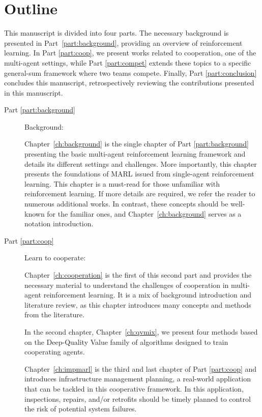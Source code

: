 \section{Outline}
\label{sec:ch1_outline}
This manuscript is divided into four parts.
The necessary background is presented in Part~\ref{part:background}, providing an overview of reinforcement learning.
In Part \ref{part:coop}, we present works related to cooperation, one of the multi-agent settings, while Part \ref{part:compet} extends these topics to a specific general-sum framework where two teams compete.
Finally, Part \ref{part:conclusion} concludes this manuscript, retrospectively reviewing the contributions presented in this manuscript.

\begin{description}
    \item [Part \ref{part:background}] Background:
    
    Chapter~\ref{ch:background} is the single chapter of Part \ref{part:background} presenting the basic multi-agent reinforcement learning framework and details its different settings and challenges.
    More importantly, this chapter presents the foundations of MARL issued from single-agent reinforcement learning.
    This chapter is a must-read for those unfamiliar with reinforcement learning. 
    If more details are required, we refer the reader to numerous additional works.
    In contrast, these concepts should be well-known for the familiar ones, and Chapter~\ref{ch:background} serves as a notation introduction.

    \item [Part \ref{part:coop}] Learn to cooperate:
    
    Chapter~\ref{ch:cooperation} is the first of this second part and provides the necessary material to understand the challenges of cooperation in multi-agent reinforcement learning.
    It is a mix of background introduction and literature review, as this chapter introduces many concepts and methods from the literature.
    
    In the second chapter, Chapter~\ref{ch:qvmix}, we present four methods based on the Deep-Quality Value family of algorithms designed to train cooperating agents.
    
    Chapter~\ref{ch:impmarl} is the third and last chapter of Part \ref{part:coop} and introduces infrastructure management planning, a real-world application that can be tackled in this cooperative framework.
    In this application, inspections, repairs, and/or retrofits should be timely planned to control the risk of potential system failures.
    

\end{description}

